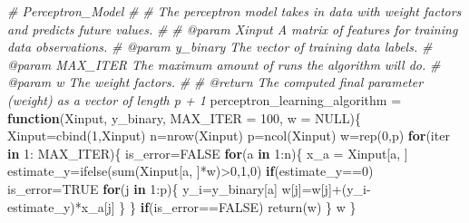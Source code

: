 \documentclass[
]{article}
\newenvironment{Shaded}{\begin{snugshade}}{\end{snugshade}}
\newcommand{\AttributeTok}[1]{\textcolor[rgb]{0.77,0.63,0.00}{#1}}
\newcommand{\CommentTok}[1]{\textcolor[rgb]{0.56,0.35,0.01}{\textit{#1}}}
\newcommand{\ConstantTok}[1]{\textcolor[rgb]{0.00,0.00,0.00}{#1}}
\newcommand{\ControlFlowTok}[1]{\textcolor[rgb]{0.13,0.29,0.53}{\textbf{#1}}}
\newcommand{\DecValTok}[1]{\textcolor[rgb]{0.00,0.00,0.81}{#1}}
\newcommand{\FunctionTok}[1]{\textcolor[rgb]{0.00,0.00,0.00}{#1}}
\newcommand{\NormalTok}[1]{#1}
\newcommand{\OtherTok}[1]{\textcolor[rgb]{0.56,0.35,0.01}{#1}}
\newcommand{\SpecialCharTok}[1]{\textcolor[rgb]{0.00,0.00,0.00}{#1}}
\begin{document}
\begin{Shaded}
\begin{Highlighting}[]
\CommentTok{\#\textquotesingle{} Perceptron\_Model}
\CommentTok{\#\textquotesingle{}}
\CommentTok{\#\textquotesingle{} The perceptron model takes in data with weight factors and predicts future values.}
\CommentTok{\#\textquotesingle{}}
\CommentTok{\#\textquotesingle{} @param Xinput      A matrix of features for training data observations.}
\CommentTok{\#\textquotesingle{} @param y\_binary    The vector of training data labels.}
\CommentTok{\#\textquotesingle{} @param MAX\_ITER    The maximum amount of runs the algorithm will do.}
\CommentTok{\#\textquotesingle{} @param w           The weight factors.}
\CommentTok{\#\textquotesingle{}}
\CommentTok{\#\textquotesingle{} @return            The computed final parameter (weight) as a vector of length p + 1}
\NormalTok{perceptron\_learning\_algorithm }\OtherTok{=} \ControlFlowTok{function}\NormalTok{(Xinput, y\_binary, }\AttributeTok{MAX\_ITER =} \DecValTok{100}\NormalTok{, }\AttributeTok{w =} \ConstantTok{NULL}\NormalTok{)\{}
\NormalTok{  Xinput}\OtherTok{=}\FunctionTok{cbind}\NormalTok{(}\DecValTok{1}\NormalTok{,Xinput)}
\NormalTok{  n}\OtherTok{=}\FunctionTok{nrow}\NormalTok{(Xinput)}
\NormalTok{  p}\OtherTok{=}\FunctionTok{ncol}\NormalTok{(Xinput)}
\NormalTok{  w}\OtherTok{=}\FunctionTok{rep}\NormalTok{(}\DecValTok{0}\NormalTok{,p)}
  \ControlFlowTok{for}\NormalTok{(iter }\ControlFlowTok{in} \DecValTok{1}\SpecialCharTok{:}\NormalTok{ MAX\_ITER)\{}
\NormalTok{    is\_error}\OtherTok{=}\ConstantTok{FALSE}
    \ControlFlowTok{for}\NormalTok{(a }\ControlFlowTok{in} \DecValTok{1}\SpecialCharTok{:}\NormalTok{n)\{}
\NormalTok{      x\_a }\OtherTok{=}\NormalTok{ Xinput[a, ]}
\NormalTok{      estimate\_y}\OtherTok{=}\FunctionTok{ifelse}\NormalTok{(}\FunctionTok{sum}\NormalTok{(Xinput[a, ]}\SpecialCharTok{*}\NormalTok{w)}\SpecialCharTok{\textgreater{}}\DecValTok{0}\NormalTok{,}\DecValTok{1}\NormalTok{,}\DecValTok{0}\NormalTok{)}
      \ControlFlowTok{if}\NormalTok{(estimate\_y}\SpecialCharTok{==}\DecValTok{0}\NormalTok{)}
\NormalTok{        is\_error}\OtherTok{=}\ConstantTok{TRUE}
      \ControlFlowTok{for}\NormalTok{(j }\ControlFlowTok{in} \DecValTok{1}\SpecialCharTok{:}\NormalTok{p)\{}
\NormalTok{        y\_i}\OtherTok{=}\NormalTok{y\_binary[a]}
\NormalTok{        w[j]}\OtherTok{=}\NormalTok{w[j]}\SpecialCharTok{+}\NormalTok{(y\_i}\SpecialCharTok{{-}}\NormalTok{estimate\_y)}\SpecialCharTok{*}\NormalTok{x\_a[j]}
\NormalTok{      \}}
\NormalTok{    \}}
    \ControlFlowTok{if}\NormalTok{(is\_error}\SpecialCharTok{==}\ConstantTok{FALSE}\NormalTok{)}
      \FunctionTok{return}\NormalTok{(w)}
\NormalTok{  \}}
\NormalTok{  w}
\NormalTok{\}}
\end{Highlighting}
\end{Shaded}
\end{document}
